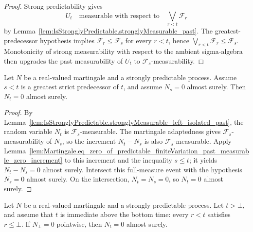 \begin{proof}
Strong predictability gives
\[
  U_t \quad\text{measurable with respect to}\quad
  \bigvee_{r<t}\mathcal F_r
\]
by Lemma~\ref{lem:IsStronglyPredictable.stronglyMeasurable_past}.  The
greatest-predecessor hypothesis implies
\(\mathcal F_r\le \mathcal F_s\) for every \(r<t\), hence
\(\bigvee_{r<t}\mathcal F_r\le \mathcal F_s\).  Monotonicity of strong
measurability with respect to the ambient sigma-algebra then upgrades the
past measurability of \(U_t\) to \(\mathcal F_s\)-measurability.
\end{proof}

\begin{lemma}\label{lem:Martingale.eq_zero_of_predictable_left_isolated_of_previous}
Let \(N\) be a real-valued martingale and a strongly predictable process.
Assume \(s<t\) is a greatest strict predecessor of \(t\), and assume
\(N_s=0\) almost surely.  Then \(N_t=0\) almost surely.
\end{lemma}

\begin{proof}
By
Lemma~\ref{lem:IsStronglyPredictable.stronglyMeasurable_left_isolated_past},
the random variable \(N_t\) is \(\mathcal F_s\)-measurable.  The martingale
adaptedness gives \(\mathcal F_s\)-measurability of \(N_s\), so the increment
\(N_t-N_s\) is also \(\mathcal F_s\)-measurable.  Apply
Lemma~\ref{lem:Martingale.eq_zero_of_predictable_finiteVariation_past_measurable_zero_increment}
to this increment and the inequality \(s\le t\); it yields
\(N_t-N_s=0\) almost surely.  Intersect this full-measure event with the
hypothesis \(N_s=0\) almost surely.  On the intersection, \(N_t=N_s=0\), so
\(N_t=0\) almost surely.
\end{proof}

\begin{lemma}\label{lem:Martingale.eq_zero_of_predictable_bottom_immediate}
Let \(N\) be a real-valued martingale and a strongly predictable process.
Let \(t>\bot\), and assume that \(t\) is immediate above the bottom time:
every \(r<t\) satisfies \(r\le \bot\).  If \(N_\bot=0\) pointwise, then
\(N_t=0\) almost surely.
\end{lemma}

